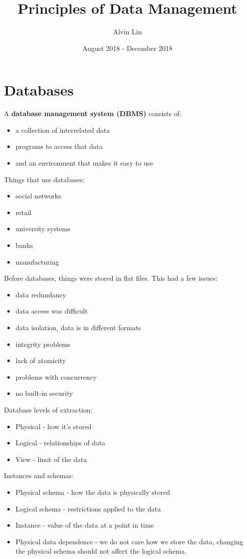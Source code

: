 \documentclass{math}
\title{Principles of Data Management}
\author{Alvin Lin}
\date{August 2018 - December 2018}
\begin{document}
\maketitle

\section*{Databases}
A \textbf{database management system (DBMS)} consists of:
\begin{itemize}
  \item a collection of interrelated data
  \item programs to access that data
  \item and an environment that makes it easy to use
\end{itemize}
Things that use databases:
\begin{itemize}
  \item social networks
  \item retail
  \item university systems
  \item banks
  \item manufacturing
\end{itemize}
Before databases, things were stored in flat files. This had a few issues:
\begin{itemize}
  \item data redundancy
  \item data access was difficult
  \item data isolation, data is in different formats
  \item integrity problems
  \item lack of atomicity
  \item problems with concurrency
  \item no built-in security
\end{itemize}
Database levels of extraction:
\begin{itemize}
  \item Physical - how it's stored
  \item Logical - relationships of data
  \item View - limit of the data
\end{itemize}
Instances and schemas:
\begin{itemize}
  \item Physical schema - how the data is physically stored
  \item Logical schema - restrictions applied to the data
  \item Instance - value of the data at a point in time
  \item Physical data dependence - we do not care how we store the data,
    changing the physical schema should not affect the logical schema.
\end{itemize}
\end{document}
